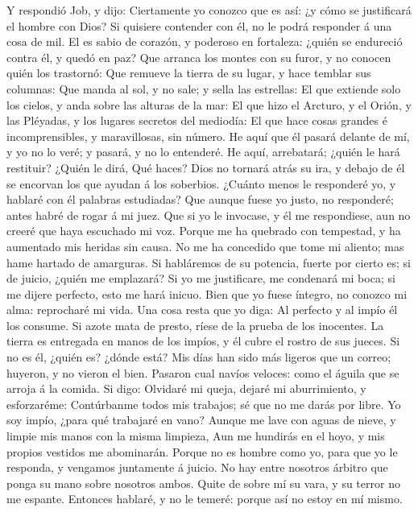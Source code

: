  Y respondió Job, y dijo:  Ciertamente yo
conozco que es así: ¿y cómo se justificará el hombre con Dios?
 Si quisiere contender con él, no le podrá responder á una
cosa de mil.  El es sabio de corazón, y poderoso en
fortaleza: ¿quién se endureció contra él, y quedó en paz? 
Que arranca los montes con su furor, y no conocen quién los trastornó:
 Que remueve la tierra de su lugar, y hace temblar sus
columnas:  Que manda al sol, y no sale; y sella las
estrellas:  El que extiende solo los cielos, y anda sobre
las alturas de la mar:  El que hizo el Arcturo, y el Orión,
y las Pléyadas, y los lugares secretos del mediodía:  El
que hace cosas grandes é incomprensibles, y maravillosas, sin número.
 He aquí que él pasará delante de mí, y yo no lo veré; y
pasará, y no lo entenderé.  He aquí, arrebatará; ¿quién le
hará restituir? ¿Quién le dirá, Qué haces?  Dios no tornará
atrás su ira, y debajo de él se encorvan los que ayudan á los soberbios.
 ¿Cuánto menos le responderé yo, y hablaré con él palabras
estudiadas?  Que aunque fuese yo justo, no responderé;
antes habré de rogar á mi juez.  Que si yo le invocase, y
él me respondiese, aun no creeré que haya escuchado mi voz.
 Porque me ha quebrado con tempestad, y ha aumentado mis
heridas sin causa.  No me ha concedido que tome mi aliento;
mas hame hartado de amarguras.  Si habláremos de su
potencia, fuerte por cierto es; si de juicio, ¿quién me emplazará?
 Si yo me justificare, me condenará mi boca; si me dijere
perfecto, esto me hará inicuo.  Bien que yo fuese íntegro,
no conozco mi alma: reprocharé mi vida.  Una cosa resta que
yo diga: Al perfecto y al impío él los consume.  Si azote
mata de presto, ríese de la prueba de los inocentes.  La
tierra es entregada en manos de los impíos, y él cubre el rostro de sus
jueces. Si no es él, ¿quién es? ¿dónde está?  Mis días han
sido más ligeros que un correo; huyeron, y no vieron el bien.
 Pasaron cual navíos veloces: como el águila que se arroja
á la comida.  Si digo: Olvidaré mi queja, dejaré mi
aburrimiento, y esforzaréme:  Contúrbanme todos mis
trabajos; sé que no me darás por libre.  Yo soy impío,
¿para qué trabajaré en vano?  Aunque me lave con aguas de
nieve, y limpie mis manos con la misma limpieza,  Aun me
hundirás en el hoyo, y mis propios vestidos me abominarán. 
Porque no es hombre como yo, para que yo le responda, y vengamos
juntamente á juicio.  No hay entre nosotros árbitro que
ponga su mano sobre nosotros ambos.  Quite de sobre mí su
vara, y su terror no me espante.  Entonces hablaré, y no le
temeré: porque así no estoy en mí mismo.


